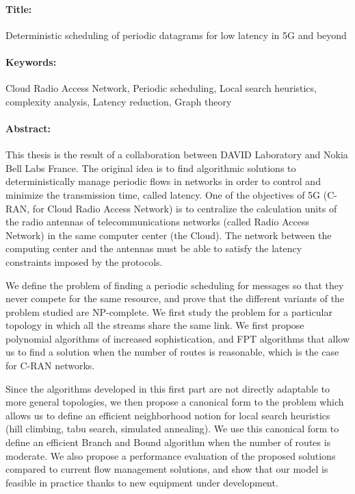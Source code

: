 \documentclass[12pt,a4paper]{book}
\begin{document}
\begin{mdframed}[linecolor=Prune,linewidth=1]
\vspace{-.25cm}
\paragraph*{Title:} Deterministic scheduling of periodic datagrams for low latency in 5G and beyond 

\begin{small}
\vspace{-.25cm}
\paragraph*{Keywords:}  Cloud Radio Access Network, Periodic scheduling, Local search heuristics, complexity analysis, Latency reduction,  Graph theory
\vspace{-.5cm}
\begin{multicols}{2}
\paragraph*{Abstract:} This thesis is the result of a collaboration between DAVID Laboratory and Nokia Bell Labs France.
The original idea is to find algorithmic solutions to deterministically manage periodic flows in networks in order to control and minimize the transmission time, called latency. One of the objectives of 5G (C-RAN, for Cloud Radio Access Network) is to centralize the calculation units of the radio antennas of telecommunications networks (called Radio Access Network) in the same computer center (the Cloud). The network between the computing center and the antennas must be able to satisfy the latency constraints imposed by the protocols.

We define the problem of finding a periodic scheduling for messages so that they never compete for the same resource, and prove that the different variants of the problem studied are NP-complete. We first study the problem for a particular topology in which all the streams share the same link. We first propose polynomial algorithms of increased sophistication, and FPT algorithms that allow us to find a solution when the number of routes is reasonable, which is the case for C-RAN networks.

Since the algorithms developed in this first part are not directly adaptable to more general topologies, we then propose a canonical form to the problem which allows us to define an efficient neighborhood notion for local search heuristics (hill climbing, tabu search, simulated annealing). We use this canonical form to define an efficient Branch and Bound algorithm when the number of routes is moderate.
We also propose a performance evaluation of the proposed solutions compared to current flow management solutions, and show that our model is feasible in practice thanks to new equipment under development.

\end{multicols}
\end{small}
\end{mdframed}
\end{document}
